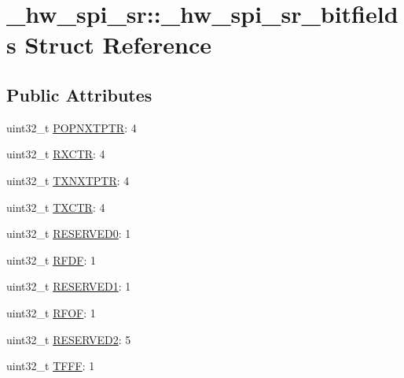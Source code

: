 \hypertarget{struct__hw__spi__sr_1_1__hw__spi__sr__bitfields}{}\section{\+\_\+hw\+\_\+spi\+\_\+sr\+:\+:\+\_\+hw\+\_\+spi\+\_\+sr\+\_\+bitfields Struct Reference}
\label{struct__hw__spi__sr_1_1__hw__spi__sr__bitfields}
\subsection*{Public Attributes}
\begin{DoxyCompactItemize}
\item 
uint32\+\_\+t \hyperlink{struct__hw__spi__sr_1_1__hw__spi__sr__bitfields_a3302fc7fd6f5d928c7b892a696ff9bc0}{P\+O\+P\+N\+X\+T\+P\+TR}\+: 4
\item 
uint32\+\_\+t \hyperlink{struct__hw__spi__sr_1_1__hw__spi__sr__bitfields_af6b3a6cf42f0183fa3deabdb9e06adb9}{R\+X\+C\+TR}\+: 4
\item 
uint32\+\_\+t \hyperlink{struct__hw__spi__sr_1_1__hw__spi__sr__bitfields_aca60b2cf1d3caed249663f383dac875c}{T\+X\+N\+X\+T\+P\+TR}\+: 4
\item 
uint32\+\_\+t \hyperlink{struct__hw__spi__sr_1_1__hw__spi__sr__bitfields_a2a93c8f023a926e7ba5d61e9c1c359e0}{T\+X\+C\+TR}\+: 4
\item 
uint32\+\_\+t \hyperlink{struct__hw__spi__sr_1_1__hw__spi__sr__bitfields_a54014aa582739ea12d23d7f3eb22d261}{R\+E\+S\+E\+R\+V\+E\+D0}\+: 1
\item 
uint32\+\_\+t \hyperlink{struct__hw__spi__sr_1_1__hw__spi__sr__bitfields_aa3100e6ea7cff8b62f9de33ed893c912}{R\+F\+DF}\+: 1
\item 
uint32\+\_\+t \hyperlink{struct__hw__spi__sr_1_1__hw__spi__sr__bitfields_a90d0c2facc8af457a0ff49cc92708f5f}{R\+E\+S\+E\+R\+V\+E\+D1}\+: 1
\item 
uint32\+\_\+t \hyperlink{struct__hw__spi__sr_1_1__hw__spi__sr__bitfields_a54598b33c09f12194ffef468017f0bd1}{R\+F\+OF}\+: 1
\item 
uint32\+\_\+t \hyperlink{struct__hw__spi__sr_1_1__hw__spi__sr__bitfields_a415143d6daa03606b34d85068c8b98a3}{R\+E\+S\+E\+R\+V\+E\+D2}\+: 5
\item 
uint32\+\_\+t \hyperlink{struct__hw__spi__sr_1_1__hw__spi__sr__bitfields_ab33efc5373fd7aaea83d9fba5dfd0dec}{T\+F\+FF}\+: 1
\item 

\end{DoxyCompactItemize}
